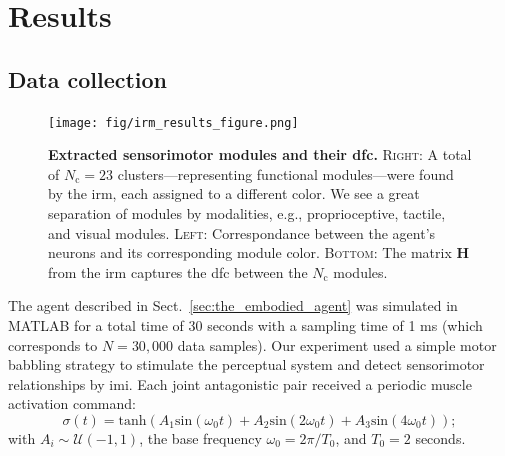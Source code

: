 \documentclass[letterpaper, 10 pt, conference]{ieeeconf}  %
\begin{document}
\section{Results}

\subsection{Data collection}
\begin{figure}[t!]
    \centering
    \texttt{[image: fig/irm\_results\_figure.png]}
    \vspace{5pt}
    \caption{\textbf{Extracted sensorimotor modules and their \ac{dfc}.} \textsc{Right}: A total of $N_\text{c}=23$ clusters---representing functional modules---were found by the \ac{irm}, each assigned to a different color. We see a great separation of modules by modalities, e.g., proprioceptive, tactile, and visual modules. \textsc{Left}: Correspondance between the agent's neurons and its corresponding module color. \textsc{Bottom}: The matrix $\bm{H}$ from the \ac{irm} captures the \ac{dfc} between the $N_\text{c}$ modules.}
    \label{fig:irm_modules}
    \vspace{-15pt}
\end{figure}

The agent described in Sect.~\ref{sec:the_embodied_agent} was simulated in MATLAB for a total time of 30 seconds with a sampling time of 1 ms (which corresponds to $N = 30,000$ data samples). Our experiment used a simple motor babbling strategy to stimulate the perceptual system and detect sensorimotor relationships by \ac{imi}. Each joint antagonistic pair received a periodic muscle activation command:
\begin{equation}\label{eq:motor_babbling_torques}
	\sigma(t) =  \text{tanh} \left( A_1 \text{sin}\left(\omega_0 t\right) + A_2 \text{sin}\left(2\omega_0 t\right) + A_3 \text{sin}\left(4\omega_0 t\right) \right);
\end{equation}	
with $A_i \sim \mathcal{U}(-1,1)$, the base frequency $\omega_0 = 2\pi/T_0$, and $T_0=2$ seconds.
\end{document}
